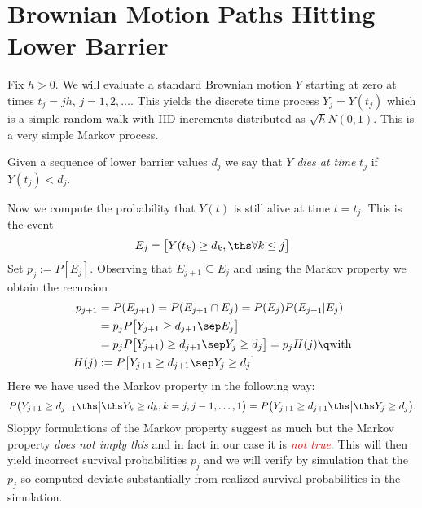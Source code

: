 \section{Brownian Motion Paths Hitting Lower Barrier}

Fix $h>0$. We will evaluate a standard Brownian motion $Y$ starting at zero at 
times $t_j=jh$, $j=1,2,\dots$. This yields the discrete time process $Y_j=Y(t_j)$ 
which is a simple random walk with IID increments distributed as $\sqrt{h}N(0,1)$.
This is a very simple Markov process.

Given a sequence of lower barrier values $d_j$ 
we say that $Y$ \textit{dies at time} $t_j$ if $Y(t_j)<d_j$.

Now we compute the probability that $Y(t)$ is still alive at time $t=t_j$. 
This is the event
$$
E_j=\big[Y(t_k)\geq d_k,\ths\forall k\leq j\big]
$$
Set $p_j:=P[E_j]$. Observing that $E_{j+1}\subseteq E_j$ and using the Markov property 
we obtain the recursion
%
\begin{align*}
p_{j+1} &= P(E_{j+1})=P(E_{j+1}\cap E_j)=P(E_j)P(E_{j+1}|E_j)\\&=
p_jP\big[Y_{j+1}\geq d_{j+1}\sep E_j\big]\\&=
p_jP\big[Y_{j+1})\geq d_{j+1}\sep Y_j\geq d_j\big] = p_jH(j)
\q\text{with}\\
H(j) &:= P\big[Y_{j+1}\geq d_{j+1}\sep Y_j\geq d_j\big]
\end{align*}
% 
Here we have used the Markov property in the following way:
%
\begin{equation}
\label{markov}
P\big(Y_{j+1}\geq d_{j+1}\ths\big|\ths Y_k\geq d_k, k=j,j-1,\dots,1\big) =
P\big(Y_{j+1}\geq d_{j+1}\ths\big|\ths Y_j\geq d_j\big).
\end{equation}
%
Sloppy formulations of the Markov property suggest as much but the Markov property 
\textit{does not imply this} and in fact in our case it is \textit{\textcolor{red}{not true}}.
This will then yield incorrect survival probabilities $p_j$ and we will verify by simulation
that the $p_j$ so computed deviate substantially from realized survival probabilities in the 
simulation.

